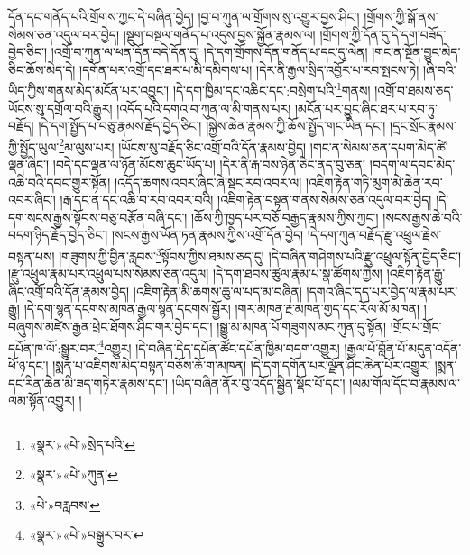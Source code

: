 དོན་དང་གནོད་པའི་གྲོགས་ཀྱང་དེ་བཞིན་བྱེད། །བྱ་བ་ཀུན་ལ་གྲོགས་སུ་འགྱུར་བྱས་ཤིང་། །གྲོགས་ཀྱི་སྒོ་ནས་སེམས་ཅན་འདུལ་བར་བྱེད། །སྡུག་བསྔལ་གནོད་པ་འདུས་བྱས་སྐྱོན་རྣམས་ལ། །གྲོགས་ཀྱི་དོན་དུ་དེ་དག་བཟོད་བྱེད་ཅིང་། །འགྲོ་བ་ཀུན་ལ་ཕན་དོན་བདེ་དོན་དུ། །དེ་དག་གྲོགས་དོན་གནོད་པ་དང་དུ་ལེན། །གང་ན་སྔོན་བྱུང་མེད་ཅིང་ཆོས་མེད་དེ། །དགོན་པར་འགྲོ་དང་ཐར་པ་མི་དམིགས་པ། །དེར་ནི་རྒྱལ་སྲིད་འབྱོར་པ་རབ་སྤངས་ཏེ། །ཞི་བའི་ཡིད་ཀྱིས་གནས་མེད་མངོན་པར་འབྱུང་། །དེ་དག་ཁྱིམ་དང་འཆིང་དང་:བསྲེག་པའི་\footnote{«སྣར་»«པེ་»སྲེད་པའི་}གནས། །འགྲོ་བ་ཐམས་ཅད་ཡོངས་སུ་དགྲོལ་བའི་རྒྱུར། །འདོད་པའི་དགའ་བ་ཀུན་ལ་མི་གནས་པར། །མངོན་པར་བྱུང་ཞིང་ཐར་པ་རབ་ཏུ་བརྗོད། །དེ་དག་སྤྱོད་པ་བཅུ་རྣམས་རྗོད་བྱེད་ཅིང་། །སྐྱེས་ཆེན་རྣམས་ཀྱི་ཆོས་སྤྱོད་གང་ཡིན་དང་། །དྲང་སྲོང་རྣམས་ཀྱི་སྤྱོད་ཡུལ་\footnote{«སྣར་»«པེ་»ཀུན་}མ་ལུས་པར། །ཡོངས་སུ་བརྗོད་ཅིང་འགྲོ་བའི་དོན་རྣམས་བྱེད། །གང་ན་སེམས་ཅན་དཔག་མེད་ཚེ་ལྡན་ཞིང་། །བདེ་དང་ལྡན་ལ་ཉོན་མོངས་ཆུང་ཡོད་པ། །དེར་ནི་རྒ་བས་ཉེན་ཅིང་ནད་བུ་ཅན། །བདག་ལ་དབང་མེད་འཆི་བའི་དབང་གྱུར་སྟོན། །འདོད་ཆགས་འབར་ཞིང་ཞེ་སྡང་རབ་འབར་ལ། །འཇིག་རྟེན་གཏི་མུག་མེ་ཆེན་རབ་འབར་ཞིང་། །རྒ་དང་ན་དང་འཆི་བ་རབ་འབར་བའི། །འཇིག་རྟེན་བསྟན་གནས་སེམས་ཅན་འདུལ་བར་བྱེད། །དེ་དག་སངས་རྒྱས་སྟོབས་བཅུ་བརྩོན་བཞི་དང་། །ཆོས་ཀྱི་ཁྱད་པར་བཅོ་བརྒྱད་རྣམས་ཀྱིས་ཀྱང་། །སངས་རྒྱས་ཆེ་བའི་བདག་ཉིད་རྗོད་བྱེད་ཅིང་། །སངས་རྒྱས་ཡོན་ཏན་རྣམས་ཀྱིས་འགྲོ་དོན་བྱེད། །དེ་དག་ཀུན་བརྗོད་རྫུ་འཕྲུལ་རྗེས་བསྟན་པས། །གཟུགས་ཀྱི་བྱིན་རླབས་\footnote{«པེ་»བརླབས་}སྟོབས་ཀྱིས་ཐམས་ཅད་དུ། །དེ་བཞིན་གཤེགས་པའི་རྫུ་འཕྲུལ་སྟོན་བྱེད་ཅིང་། །རྫུ་འཕྲུལ་རྣམ་པར་འཕྲུལ་པས་སེམས་ཅན་འདུལ། །དེ་དག་ཐབས་ཚུལ་རྣམ་པ་སྣ་ཚོགས་ཀྱིས། །འཇིག་རྟེན་རྒྱུ་ཞིང་འགྲོ་བའི་དོན་རྣམས་བྱེད། །འཇིག་རྟེན་མི་ཆགས་ཆུ་ལ་པད་མ་བཞིན། །དགའ་ཞིང་དད་པར་བྱེད་ལ་རྣམ་པར་རྒྱུ། །དེ་དག་སྙན་དངགས་མཁན་རྒྱལ་སྙན་དངགས་སྦྱོར། །གར་མཁན་རྔ་མཁན་གྱད་དང་རོལ་མོ་མཁན། །བཞུགས་མཛེས་རྒྱན་ཕྲེང་ཐོགས་ཤིང་གར་བྱེད་དང་། །སྒྱུ་མ་མཁན་པོ་གཟུགས་མང་ཀུན་དུ་སྟོན། །གྲོང་པ་གྲོང་དཔོན་ཁ་ལོ་:སྒྱུར་བར་\footnote{«སྣར་»«པེ་»བསྒྱུར་བར་}འགྱུར། །དེ་བཞིན་དེད་དཔོན་ཚོང་དཔོན་ཁྱིམ་བདག་འགྱུར། །རྒྱལ་པོ་བློན་པོ་མདུན་འདོན་ཕོ་ཉ་དང་། །སྨན་པ་འཇིགས་མེད་བསྟན་བཅོས་ཆོ་ག་མཁན། །དེ་དག་དགོན་པར་ལྗོན་ཤིང་ཆེན་པོར་འགྱུར། །སྨན་དང་རིན་ཆེན་མི་ཟད་གཏེར་རྣམས་དང་། །ཡིད་བཞིན་ནོར་བུ་འདོད་སྦྱིན་སྡོང་པོ་དང་། །ལམ་གོལ་དོང་བ་རྣམས་ལ་ལམ་སྟོན་འགྱུར། །
